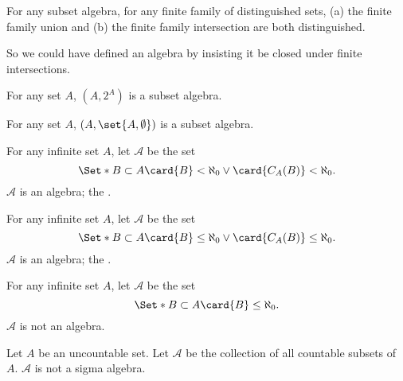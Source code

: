 \begin{prop}
  For any subset algebra,
  for any finite family of distinguished sets,
  (a) the finite family union and
  (b) the finite family intersection
  are both distinguished.
\end{prop}

So we could have defined an algebra
by insisting it be closed under finite
intersections.


\begin{expl}
  For any set $A$, $(A, 2^{A})$ is a subset algebra.
\end{expl}

\begin{expl}
  For any set $A$, $(A, \set{A, \emptyset})$ is a subset algebra.
\end{expl}

\begin{expl}
  For any infinite set $A$,
  let $\mathcal{A}$ be the set
  $$
  \Set*{
    B \subset A
  }{
    \card{B} < \aleph_0 \lor
    \card{C_{A}(B)} < \aleph_0
  }.
  $$
  $\mathcal{A}$ is an algebra;
  the
  .
\end{expl}

\begin{expl}
  For any infinite set $A$,
  let $\mathcal{A}$ be the set
  $$
  \Set*{
    B \subset A
  }{
    \card{B} \leq \aleph_0 \lor
    \card{C_{A}(B)} \leq \aleph_0
  }.
  $$
  $\mathcal{A}$ is an algebra;
  the
  .
\end{expl}


\begin{expl}
  For any infinite set $A$,
  let $\mathcal{A}$ be the set
  $$
  \Set*{
    B \subset A
  }{
    \card{B} \leq \aleph_0
  }.
  $$
  $\mathcal{A}$ is not an algebra.
\end{expl}

\begin{expl}
  Let $A$ be an uncountable set.
  Let $\mathcal{A}$ be the collection
  of all countable subsets of $A$.
  $\mathcal{A}$ is not a sigma algebra.
\end{expl}
\strats
